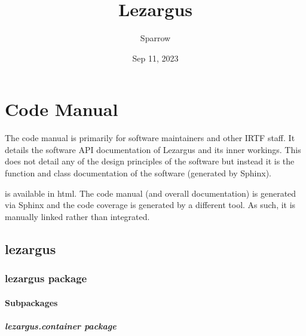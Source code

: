 \documentclass[letterpaper,11pt,english]{sphinxmanual}
\title{Lezargus}
\date{Sep 11, 2023}
\author{Sparrow}
\begin{document}
\pagestyle{empty}
\sphinxmaketitle
\pagestyle{plain}
\sphinxtableofcontents
\pagestyle{normal}
\label{\detokenize{index::doc}}



\chapter{Code Manual}
\label{\detokenize{index:code-manual}}
\sphinxAtStartPar
The code manual is primarily for software maintainers and other IRTF staff. It
details the software API documentation of Lezargus and its inner workings.
This does not detail any of the design principles of the software but instead
it is the function and class documentation of the software (generated by Sphinx).

\sphinxAtStartPar
{}%
\begin{footnote}[1]\sphinxAtStartFootnote
{}
%
\end{footnote} is available in html. The code manual (and overall
documentation) is generated via Sphinx and the code coverage is generated by
a different tool. As such, it is manually linked rather than integrated.

\sphinxstepscope


\section{lezargus}
\label{\detokenize{code/modules:lezargus}}\label{\detokenize{code/modules::doc}}
\sphinxstepscope


\subsection{lezargus package}
\label{\detokenize{code/lezargus:lezargus-package}}\label{\detokenize{code/lezargus::doc}}

\subsubsection{Subpackages}
\label{\detokenize{code/lezargus:subpackages}}
\sphinxstepscope


\paragraph{lezargus.container package}
\label{\detokenize{code/lezargus.container:lezargus-container-package}}\label{\detokenize{code/lezargus.container::doc}}
\end{document}

